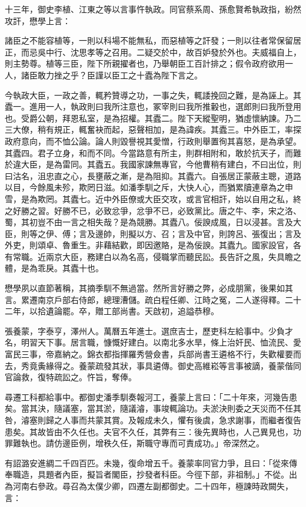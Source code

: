 \begin{pinyinscope}
十三年，御史李植、江東之等以言事忤執政。同官蔡系周、孫愈賢希執政指，紛然攻訐，懋學上言：

諸臣之不能容植等，一則以科場不能無私，而惡植等之訐發；一則以往者常保留居正，而忌吳中行、沈思孝等之召用。二疑交於中，故百妒發於外也。夫威福自上，則主勢尊。植等三臣，陛下所親擢者也，乃舉朝臣工百計排之；假令政府欲用一人，諸臣敢力挫之乎？臣謹以臣工之十蠹為陛下言之。

今執政大臣，一政之善，輒矜贊導之功，一事之失，輒諉挽回之難，是為誣上。其蠹一。進用一人，執政則曰我所注意也，冢宰則曰我所推轂也，選郎則曰我所登用也。受爵公朝，拜恩私室，是為招權。其蠹二。陛下天縱聖明，猶虛懷納諫。乃二三大僚，稍有規正，輒奮袂而起，惡聲相加，是為諱疾。其蠹三。中外臣工，率探政府意向，而不恤公論。論人則毀譽視其愛憎，行政則舉置徇其喜怒，是為承望。其蠹四。君子立身，和而不同。今當路意有所主，則群相附和，敢於抗天子，而難於違大臣，是為雷同。其蠹五。我國家諫無專官，今他曹稍有建白，不曰出位，則曰沽名，沮忠直之心，長壅蔽之漸，是為阻抑。其蠹六。自張居正蒙蔽主聰，道路以目，今餘風未殄，欺罔日滋。如潘季馴之斥，大快人心，而猶累牘連章為之申雪，是為欺罔。其蠹七。近中外臣僚或大臣交攻，或言官相訐，始以自用之私，終之好勝之習。好勝不已，必致忿爭，忿爭不已，必致黨比。唐之牛、李，宋之洛、蜀，其初豈不由一言之相失哉？是為競勝。其蠹八。佞諛成風，日以浸甚。言及大臣，則等之伊、傅；言及邊帥，則擬以方、召；言及中官，則誇呂、張復出；言及外吏，則頌卓、魯重生。非藉結歡，即因邀賂，是為佞諛。其蠹九。國家設官，各有常職。近兩京大臣，務建白以為名高，侵職掌而聽民訟。長告訐之風，失具瞻之體，是為乖戾。其蠹十也。

懋學夙以直節著稱，其摘季馴不無過當。然所言好勝之弊，必成朋黨，後果如其言。累遷南京戶部右侍郎，總理漕儲。疏白程任卿、江時之冤，二人遂得釋。二十二年，以拾遺論罷。卒，贈工部尚書。天啟初，追謚恭穆。

張養蒙，字泰亨，澤州人。萬曆五年進士。選庶吉士，歷吏科左給事中。少負才名，明習天下事。居言職，慷慨好建白。以南北多水旱，條上治奸民、恤流民、愛富民三事，帝嘉納之。錦衣都指揮羅秀營僉書，兵部尚書王遴格不行，失歡權要而去，秀竟夤緣得之。養蒙疏發其狀，事具遴傳。御史高維崧等言事被謫，養蒙偕同官論救，復特疏訟之。忤旨，奪俸。

尋遷工科都給事中。都御史潘季馴奏報河工，養蒙上言曰：「二十年來，河幾告患矣。當其決，隨議塞，當其淤，隨議濬，事竣輒論功。夫淤決則委之天災而不任其咎，濬塞則歸之人事而共蒙其賞。及報成未久，懼有後虞，急求謝事，而繼者復告患矣。其故皆由不久任也。夫官不久任，其弊有三：後先異時也，人己異見也，功罪難執也。請仿邊臣例，增秩久任，斯職守專而可責成功。」帝深然之。

有詔潞安進綢二千四百匹。未幾，復命增五千。養蒙率同官力爭，且曰：「從來傳奉職造，具題者內臣，擬旨者閣臣，抄發者科臣。今徑下部，非祖制。」不從。出為河南右參政。尋召為太僕少卿，四遷左副都御史。二十四年，極諫時政闕失，言：


\end{pinyinscope}
